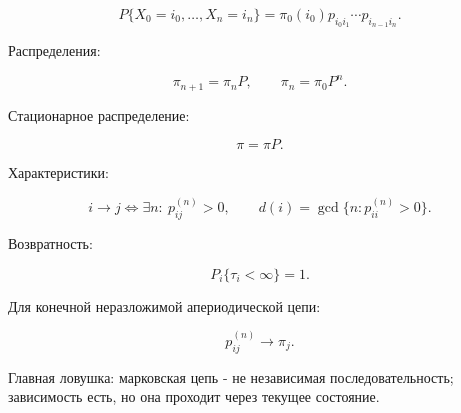 \documentclass[
  11pt,
  a4paper,
]{article}
\begin{document}
\[
P\{X_0=i_0,\ldots,X_n=i_n\}
=
\pi_0(i_0)p_{i_0i_1}\cdots p_{i_{n-1}i_n}.
\]

Распределения:

\[
\pi_{n+1}=\pi_nP,
\qquad
\pi_n=\pi_0P^n.
\]

Стационарное распределение:

\[
\pi=\pi P.
\]

Характеристики:

\[
i\to j \Leftrightarrow \exists n:\ p_{ij}^{(n)}>0,
\qquad
d(i)=\gcd\{n:p_{ii}^{(n)}>0\}.
\]

Возвратность:

\[
P_i\{\tau_i<\infty\}=1.
\]

Для конечной неразложимой апериодической цепи:

\[
p_{ij}^{(n)}\to\pi_j.
\]

Главная ловушка: марковская цепь - не независимая последовательность;
зависимость есть, но она проходит через текущее состояние.

\newpage
\end{document}
